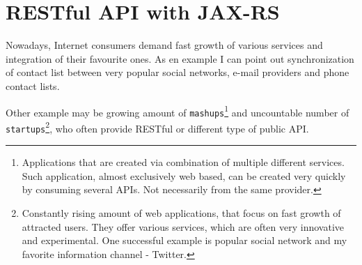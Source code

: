 \chapter{RESTful \gls{API} with JAX-RS}\label{rest}

	Nowadays, Internet consumers demand fast growth of various services and integration of their favourite ones. As en
	example I can point out synchronization of contact list between very popular social networks, e-mail providers and
	phone contact lists. 
	
	Other example may be growing amount of \verb|mashups|\footnote{Applications that are created via
	combination of multiple different services. Such application, almost exclusively web based, can be created very quickly
	by consuming several \gls{API}s. Not necessarily from the same provider.} and uncountable number of
	\verb|startups|\footnote{Constantly rising amount of web applications, that focus on fast growth of attracted users.
	They offer various services, which are often very innovative and experimental. One successful example is popular
	social network and my favorite information channel - Twitter.}, who often provide RESTful or different type of public
	\gls{API}.

	